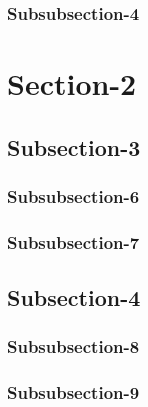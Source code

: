 \documentclass{memoir}
\begin{document}
				\subsubsection{Subsubsection-4}
		
		
		
		\section{Section-2}
		
			\subsection{Subsection-3}	
		
				\subsubsection{Subsubsection-6}
		
				\subsubsection{Subsubsection-7}
		
			\subsection{Subsection-4}
		
				\subsubsection{Subsubsection-8}
		
				\subsubsection{Subsubsection-9}
	
\end{document}
